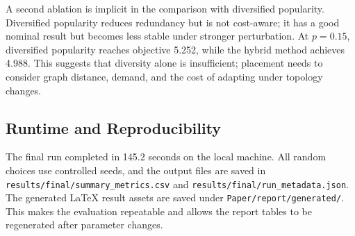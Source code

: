 A second ablation is implicit in the comparison with diversified popularity. Diversified popularity reduces redundancy but is not cost-aware; it has a good nominal result but becomes less stable under stronger perturbation. At \(p=0.15\), diversified popularity reaches objective 5.252, while the hybrid method achieves 4.988. This suggests that diversity alone is insufficient; placement needs to consider graph distance, demand, and the cost of adapting under topology changes.

\subsection{Runtime and Reproducibility}

The final run completed in 145.2 seconds on the local machine. All random choices use controlled seeds, and the output files are saved in \texttt{results/final/summary\_metrics.csv} and \texttt{results/final/run\_metadata.json}. The generated LaTeX result assets are saved under \texttt{Paper/report/generated/}. This makes the evaluation repeatable and allows the report tables to be regenerated after parameter changes.
